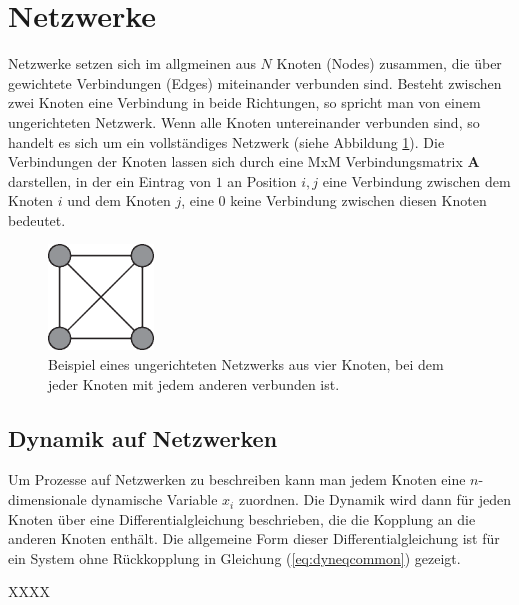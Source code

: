 
\section{Netzwerke}
Netzwerke setzen sich im allgmeinen aus $N$ Knoten (Nodes) zusammen, die über gewichtete Verbindungen (Edges) miteinander verbunden sind. Besteht zwischen zwei Knoten eine Verbindung in beide Richtungen, so spricht man von einem ungerichteten Netzwerk. Wenn alle Knoten untereinander verbunden sind, so handelt es sich um ein vollständiges Netzwerk (siehe Abbildung \ref{fig:GraphBsp}). Die Verbindungen der Knoten lassen sich durch eine MxM Verbindungsmatrix $\boldsymbol{A}$ darstellen, in der ein Eintrag von $1$ an Position $i,j$ eine Verbindung zwischen dem Knoten $i$ und dem Knoten $j$, eine $0$ keine Verbindung zwischen diesen Knoten bedeutet.

\begin{figure}[t]
	 \centering
	\includegraphics[width=0.25\textwidth]{abb/misc/GraphBsp.eps}
	\caption[Ungerichteres Netzwerk]{Beispiel eines ungerichteten Netzwerks aus vier Knoten, bei dem jeder Knoten mit jedem anderen verbunden ist.}
	\label{fig:GraphBsp}
\end{figure}


\subsection*{Dynamik auf Netzwerken}
Um Prozesse auf Netzwerken zu beschreiben kann man jedem Knoten eine $n$-dimensionale dynamische Variable $x_i$ zuordnen. Die Dynamik wird dann für jeden Knoten über eine Differentialgleichung beschrieben, die die Kopplung an die anderen Knoten enthält. Die allgemeine Form dieser Differentialgleichung ist für ein System ohne Rückkopplung in Gleichung (\ref*{eq:dyneqcommon}) gezeigt.

XXXX

